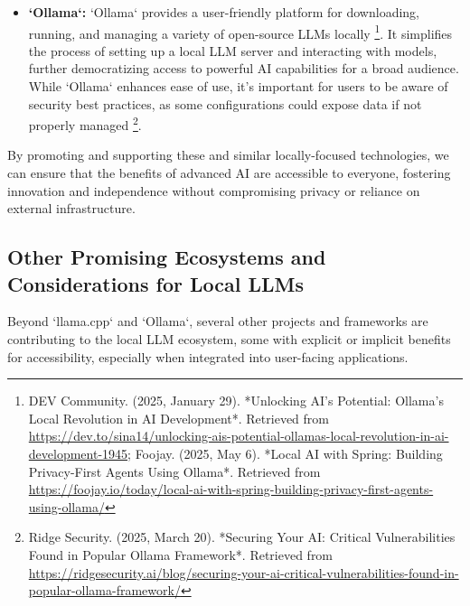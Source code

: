 \begin{itemize}
    \item \textbf{`Ollama`:} `Ollama` provides a user-friendly platform for downloading, running, and managing a variety of open-source LLMs locally \footnote{DEV Community. (2025, January 29). *Unlocking AI's Potential: Ollama's Local Revolution in AI Development*. Retrieved from \url{https://dev.to/sina14/unlocking-ais-potential-ollamas-local-revolution-in-ai-development-1945}; Foojay. (2025, May 6). *Local AI with Spring: Building Privacy-First Agents Using Ollama*. Retrieved from \url{https://foojay.io/today/local-ai-with-spring-building-privacy-first-agents-using-ollama/}}. It simplifies the process of setting up a local LLM server and interacting with models, further democratizing access to powerful AI capabilities for a broad audience. While `Ollama` enhances ease of use, it's important for users to be aware of security best practices, as some configurations could expose data if not properly managed \footnote{Ridge Security. (2025, March 20). *Securing Your AI: Critical Vulnerabilities Found in Popular Ollama Framework*. Retrieved from \url{https://ridgesecurity.ai/blog/securing-your-ai-critical-vulnerabilities-found-in-popular-ollama-framework/}}.

\end{itemize}
By promoting and supporting these and similar locally-focused technologies, we can ensure that the benefits of advanced AI are accessible to everyone, fostering innovation and independence without compromising privacy or reliance on external infrastructure.
\subsection{Other Promising Ecosystems and Considerations for Local LLMs}

Beyond `llama.cpp` and `Ollama`, several other projects and frameworks are contributing to the local LLM ecosystem, some with explicit or implicit benefits for accessibility, especially when integrated into user-facing applications.


